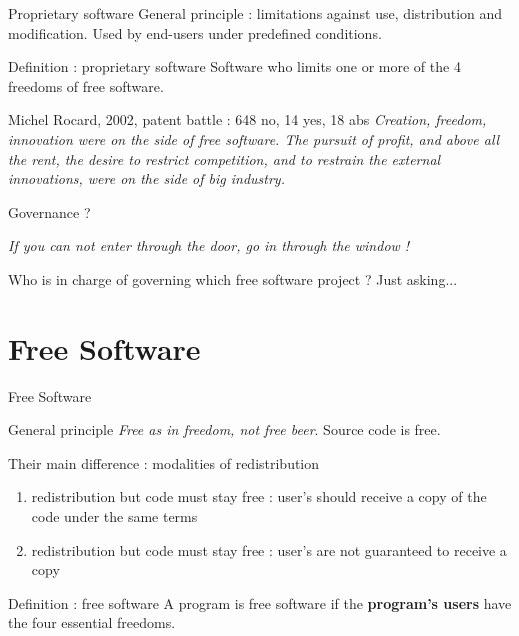 \documentclass{beamer}
\begin{document}
\begin{frame}{Proprietary software}
  General principle : limitations against use, distribution and modification. Used by end-users under predefined conditions.

  \begin{alertblock}{Definition : proprietary software}
    Software who limits one or more of the 4 freedoms of free software.    
  \end{alertblock}

\pause

  \begin{block}{Michel Rocard, 2002, patent battle : 648 no, 14 yes, 18 abs}
   \textit{Creation, freedom, innovation were on the side of free software. The pursuit of profit, and above all the rent, the desire to restrict competition, and to restrain the external innovations, were on the side of big industry.}
  \end{block}
\end{frame}

\begin{frame}{Governance ?}
  
\textit{If you can not enter through the door, go in through the window !}

Who is in charge of governing which free software project ? Just asking...

\end{frame}


\section{Free Software}


\begin{frame}{Free Software}

  \begin{alertblock}{General principle}
    \textit{Free as in freedom, not free beer}. Source code is free.
  \end{alertblock}
  Their main difference : modalities of redistribution
  \begin{enumerate}
  \item redistribution but code must stay free : user's should receive a copy of the code under the same terms
  \item redistribution but code must stay free : user's are not guaranteed to receive a copy
  \end{enumerate}

  \begin{alertblock}{Definition : free software}
   A program is free software if the \textbf{program's users} have the four essential freedoms.
  \end{alertblock}
  
\end{frame}
\end{document}
